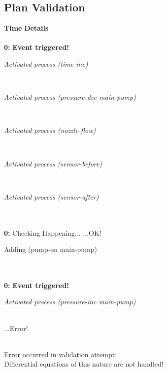 \documentclass[a4paper,12pt]{article}
\newcommand{\headingtimedetails}{{\bf Time} \qquad \= {\bf Details}\\[0.8ex]}
\newcommand{\atime}[1]{{\bf #1:}}
\newcommand{\action}[1]{{\sf #1}}
\newcommand{\exprn}[1]{{\sf #1}}
\newcommand{\checkhappening}{Checking Happening... }
\newcommand{\eventtriggered}{{\bf Event triggered!}}
\newcommand{\listrow}[1]{\begin{minipage}[t]{11.5cm} #1 \end{minipage}}
\newcommand{\happeningOK}{...OK!}
\newcommand{\aprocessactivated}[1]{\listrow{{\it Activated process #1} }}
\newcommand{\adding}[1]{\listrow{Adding \exprn{#1} }}
\newcommand{\error}{...Error!\\}
\begin{document}
\subsection{Plan Validation}
\begin{tabbing}
\headingtimedetails 
\\
 \atime{0} \> \eventtriggered \\
\> \aprocessactivated{\action{(time-inc)}}\\
\> \aprocessactivated{\action{(pressure-dec main-pump)}}\\
\> \aprocessactivated{\action{(nozzle-flow)}}\\
\> \aprocessactivated{\action{(sensor-before)}}\\
\> \aprocessactivated{\action{(sensor-after)}}\\
\\
\atime{0} \> \checkhappening\happeningOK\\
 \> \adding{(pump-on main-pump)}\\
\\
 \atime{0} \> \eventtriggered \\
\> \aprocessactivated{\action{(pressure-inc main-pump)}}\\
\error \\
\end{tabbing}
Error occurred in validation attempt:\\
  Differential equations of this nature are not handled!
\end{document}
